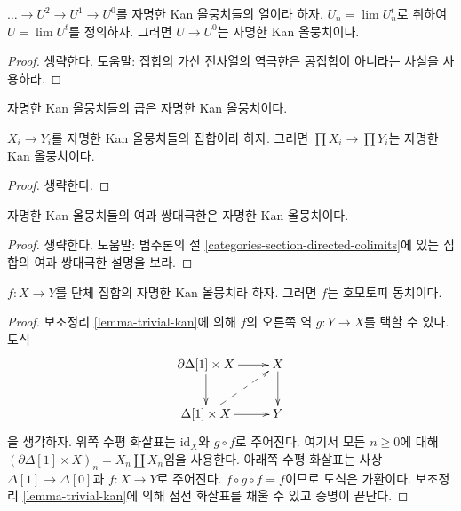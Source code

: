 \begin{lemma}
\label{lemma-limit-trivial-kan}
$\ldots \to U^2 \to U^1 \to U^0$를 자명한 Kan 올뭉치들의 열이라 하자.
$U_n = \lim U_n^t$로 취하여 $U = \lim U^t$를 정의하자. 그러면
$U \to U^0$는 자명한 Kan 올뭉치이다.
\end{lemma}

\begin{proof}
생략한다. 도움말: 집합의 가산 전사열의 역극한은 공집합이 아니라는
사실을 사용하라.
\end{proof}

\begin{lemma}
\label{lemma-product-trivial-kan}
\begin{slogan}
자명한 Kan 올뭉치들의 곱은 자명한 Kan 올뭉치이다.
\end{slogan}
$X_i \to Y_i$를 자명한 Kan 올뭉치들의 집합이라 하자. 그러면
$\prod X_i \to \prod Y_i$는 자명한 Kan 올뭉치이다.
\end{lemma}

\begin{proof}
생략한다.
\end{proof}

\begin{lemma}
\label{lemma-filtered-colimit-trivial-kan}
자명한 Kan 올뭉치들의 여과 쌍대극한은 자명한 Kan 올뭉치이다.
\end{lemma}

\begin{proof}
생략한다. 도움말: 범주론의 절
\ref{categories-section-directed-colimits}에 있는 집합의 여과 쌍대극한
설명을 보라.
\end{proof}

\begin{lemma}
\label{lemma-trivial-kan-homotopy}
$f : X \to Y$를 단체 집합의 자명한 Kan 올뭉치라 하자. 그러면 $f$는
호모토피 동치이다.
\end{lemma}

\begin{proof}
보조정리 \ref{lemma-trivial-kan}에 의해 $f$의 오른쪽 역
$g : Y \to X$를 택할 수 있다.
도식
$$
\xymatrix{
\partial \Delta[1] \times X \ar[d] \ar[r] & X \ar[d] \\
\Delta[1] \times X \ar[r] \ar@{-->}[ru] & Y
}
$$
을 생각하자. 위쪽 수평 화살표는 $\text{id}_X$와 $g \circ f$로 주어진다.
여기서 모든 $n \geq 0$에 대해
$(\partial \Delta[1] \times X)_n = X_n \amalg X_n$임을 사용한다.
아래쪽 수평 화살표는 사상 $\Delta[1] \to \Delta[0]$과
$f : X \to Y$로 주어진다. $f \circ g \circ f = f$이므로 도식은
가환이다. 보조정리 \ref{lemma-trivial-kan}에 의해 점선 화살표를 채울
수 있고 증명이 끝난다.
\end{proof}






